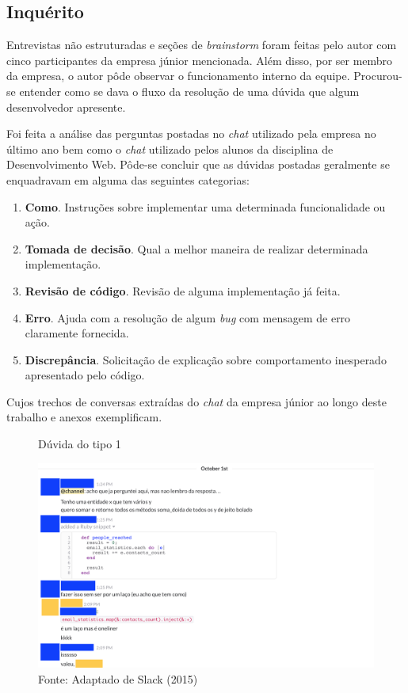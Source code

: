 \subsection{Inquérito}

Entrevistas não estruturadas e seções de \textit{brainstorm} foram feitas pelo autor com cinco participantes da empresa júnior mencionada. Além disso, por ser membro da empresa, o autor pôde observar o funcionamento interno da equipe. Procurou-se entender como se dava o fluxo da resolução de uma dúvida que algum desenvolvedor apresente.

Foi feita a análise das perguntas postadas no \textit{chat} utilizado pela empresa no último ano bem como o \textit{chat} utilizado pelos alunos da disciplina de Desenvolvimento Web. Pôde-se concluir que as dúvidas postadas geralmente se enquadravam em alguma das seguintes categorias:

\begin{enumerate}
  \item \textbf{Como}. Instruções sobre implementar uma determinada funcionalidade ou ação.
  \item \textbf{Tomada de decisão}. Qual a melhor maneira de realizar determinada implementação.
  \item \textbf{Revisão de código}. Revisão de alguma implementação já feita.
  \item \textbf{Erro}. Ajuda com a resolução de algum \textit{bug} com mensagem de erro claramente fornecida.
  \item \textbf{Discrepância}. Solicitação de explicação sobre comportamento inesperado apresentado pelo código.
\end{enumerate}

Cujos trechos de conversas extraídas do \textit{chat} da empresa júnior ao longo deste trabalho e anexos exemplificam.

\begin{figure}[h]
	\centering
    \caption{Dúvida do tipo 1}
    \includegraphics[width=15cm]{Imagens/c-type-1-9-1.png}
	\caption*{Fonte: Adaptado de Slack (2015)}
\end{figure}

